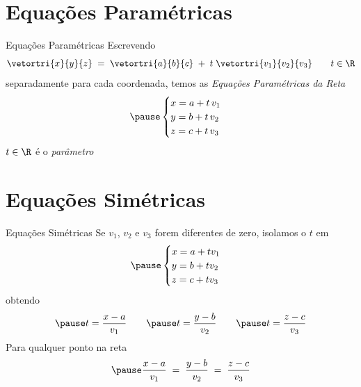 \documentclass[fleqn,aspectratio=169,12pt]{beamer}
\begin{document}
\section{Equações Paramétricas}

\begin{frame}{Equações Paramétricas}
  Escrevendo
 \[
    \vetortri{x}{y}{z}
    \;=\; \vetortri{a}{b}{c}
    \;+\; t\; \vetortri{v_1}{v_2}{v_3}
    \qquad t \in \R
  \]
  \pause
  separadamente para cada coordenada,
  \pause
  temos as \emph{Equações Paramétricas da Reta}
  \[
    \pause
    \begin{cases}
      x = a + t\,v_1 \\
      y = b + t\,v_2 \\
      z = c + t\,v_3
    \end{cases}
  \]
  \pause
  $t \in \R$ é o \emph{parâmetro}
\end{frame}





\section{Equações Simétricas}

\begin{frame}{Equações Simétricas}
  Se $v_1$, $v_2$ e $v_3$ forem diferentes de zero,
  \pause
  isolamos o $t$ em
  \[
    \pause
    \begin{cases}
      x = a + tv_1 \\
      y = b + tv_2 \\
      z = c + tv_3
    \end{cases}
  \]
  \pause
  obtendo
  \[
    \pause
    t = \frac{x-a}{v_1} \qquad \pause
    t = \frac{y-b}{v_2} \qquad \pause
    t = \frac{z-c}{v_3}
  \]
  \pause
  Para qualquer ponto na reta
  \[
    \pause
    \frac{x-a}{v_1} \;=\;
    \frac{y-b}{v_2} \;=\;
    \frac{z-c}{v_3}
  \]
\end{frame}



\end{document}
